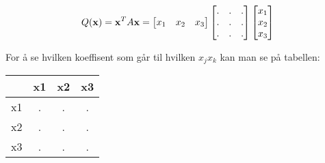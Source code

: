$$Q(\mathbf{x})
  = \mathbf{x}^T A \mathbf{x}
  = \begin{bmatrix} x_1 & x_2 & x_3 \end{bmatrix}
    \begin{bmatrix} .&.&.\\.&.&.\\.&.&. \end{bmatrix}
    \begin{bmatrix} x_1 \\ x_2 \\ x_3 \end{bmatrix}$$

For å se hvilken koeffisent som går til hvilken $x_jx_k$ kan man se på tabellen:

\begin{tabular}{c|c c c}
     & x1 & x2 & x3 \\ \hline
  x1 & .  & .  & .  \\
  x2 & .  & .  & .  \\
  x3 & .  & .  & .
\end{tabular}
